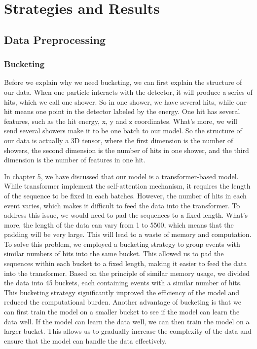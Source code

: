 \chapter{Strategies and Results}
\section{Data Preprocessing}

\subsection{Bucketing}
Before we explain why we need bucketing, we can first explain the structure of our data. When one particle interacts with the detector, it will produce a series of hits, which we call one shower. So in one shower, we have several hits, while one hit means one point in the detector labeled by the energy. One hit has several features, such as the hit energy, x, y and z coordinates. What's more, we will send several showers make it to be one batch to our model. So the structure of our data is actually a 3D tensor, where the first dimension is the number of showers, the second dimension is the number of hits in one shower, and the third dimension is the number of features in one hit.

In chapter 5, we have discussed that our model is a transformer-based model. While transformer implement the self-attention mechanism, it requires the length of the sequence to be fixed in each batches. However, the number of hits in each event varies, which makes it difficult to feed the data into the transformer. To address this issue, we would need to pad the sequences to a fixed length. What's more, the length of the data can vary from 1 to 5500, which means that the padding will be very large. This will lead to a waste of memory and computation. To solve this problem, we employed a bucketing strategy to group events with similar numbers of hits into the same bucket. This allowed us to pad the sequences within each bucket to a fixed length, making it easier to feed the data into the transformer. Based on the principle of similar memory usage, we divided the data into 45 buckets, each containing events with a similar number of hits. This bucketing strategy significantly improved the efficiency of the model and reduced the computational burden. Another advantage of bucketing is that we can first train the model on a smaller bucket to see if the model can learn the data well. If the model can learn the data well, we can then train the model on a larger bucket. This allows us to gradually increase the complexity of the data and ensure that the model can handle the data effectively.
